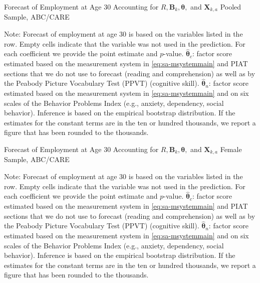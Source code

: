 \begin{table}
\begin{threeparttable}
\caption{Forecast of Employment at Age 30 Accounting for $R, \bm{B}_k, \bm{\theta},$ and $\bm{X}_{k,a}$ Pooled Sample, ABC/CARE}
\label{table:end2}
\centering
\scriptsize

\begin{tablenotes}
\footnotesize
\item Note: Forecast of employment at age 30 is based on the variables listed in the row. Empty cells indicate that the variable was not used in the prediction. For each coefficient we provide the point estimate and $p$-value. $\hat{\bm{\theta}}_{c}$: factor score estimated based on the measurement system in \eqref{eq:sa-msystemmain} and PIAT sections that we do not use to forecast (reading and comprehension) as well as by the Peabody Picture Vocabulary Test (PPVT) (cognitive skill). $\hat{\bm{\theta}}_{n}$: factor score estimated based on the measurement system in \eqref{eq:sa-msystemmain} and on six scales of the Behavior Problems Index (e.g., anxiety, dependency, social behavior). Inference is based on the empirical bootstrap distribution. If the estimates for the constant terms are in the ten or hundred thousands, we report a figure that has been rounded to the thousands.
\end{tablenotes}
\end{threeparttable}
\end{table}

\begin{table}
\begin{threeparttable}
\caption{Forecast of Employment at Age 30 Accounting for $R, \bm{B}_k, \bm{\theta},$ and $\bm{X}_{k,a}$ Female Sample, ABC/CARE}
\label{table:end2}
\centering
\scriptsize

\begin{tablenotes}
\footnotesize
\item Note: Forecast of employment at age 30 is based on the variables listed in the row. Empty cells indicate that the variable was not used in the prediction. For each coefficient we provide the point estimate and $p$-value. $\hat{\bm{\theta}}_{c}$: factor score estimated based on the measurement system in \eqref{eq:sa-msystemmain} and PIAT sections that we do not use to forecast (reading and comprehension) as well as by the Peabody Picture Vocabulary Test (PPVT) (cognitive skill). $\hat{\bm{\theta}}_{n}$: factor score estimated based on the measurement system in \eqref{eq:sa-msystemmain} and on six scales of the Behavior Problems Index (e.g., anxiety, dependency, social behavior). Inference is based on the empirical bootstrap distribution. If the estimates for the constant terms are in the ten or hundred thousands, we report a figure that has been rounded to the thousands.
\end{tablenotes}
\end{threeparttable}
\end{table}

